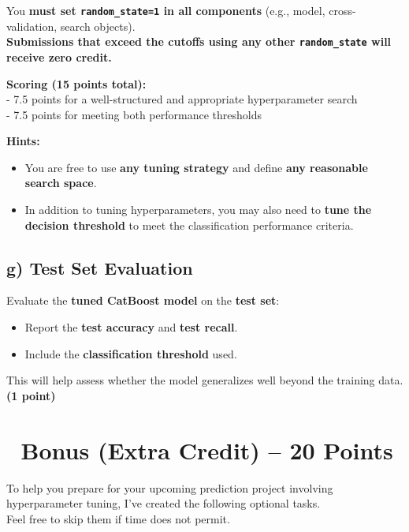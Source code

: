 \documentclass[
  letterpaper,
  DIV=11,
  numbers=noendperiod]{scrreprt}
\providecommand{\tightlist}{%
  \setlength{\itemsep}{0pt}\setlength{\parskip}{0pt}}\usepackage{longtable,booktabs,array}
\begin{document}
You \textbf{must set \texttt{random\_state=1} in all components} (e.g.,
model, cross-validation, search objects).\\
\textbf{Submissions that exceed the cutoffs using any other
\texttt{random\_state} will receive zero credit.}

\textbf{Scoring (15 points total):}\\
- 7.5 points for a well-structured and appropriate hyperparameter
search\\
- 7.5 points for meeting both performance thresholds

\textbf{Hints:}

\begin{itemize}
\tightlist
\item
  You are free to use \textbf{any tuning strategy} and define
  \textbf{any reasonable search space}.
\item
  In addition to tuning hyperparameters, you may also need to
  \textbf{tune the decision threshold} to meet the classification
  performance criteria.
\end{itemize}

\subsection{g) Test Set Evaluation}\label{g-test-set-evaluation}

Evaluate the \textbf{tuned CatBoost model} on the \textbf{test set}:

\begin{itemize}
\tightlist
\item
  Report the \textbf{test accuracy} and \textbf{test recall}.
\item
  Include the \textbf{classification threshold} used.
\end{itemize}

This will help assess whether the model generalizes well beyond the
training data.\\
\textbf{(1 point)}

\section{🎁 Bonus (Extra Credit) -- 20
Points}\label{bonus-extra-credit-20-points}

To help you prepare for your upcoming prediction project involving
hyperparameter tuning, I've created the following optional tasks.\\
Feel free to skip them if time does not permit.
\end{document}
